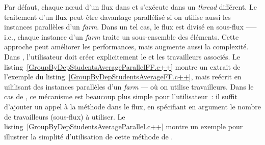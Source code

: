 Par d\'efaut, chaque nœud d'un flux dans  et  s'ex\'ecute dans un \emph{thread} diff\'erent. Le traitement d'un flux peut \^etre davantage parall\'elis\'e si on utilise aussi les instances parall\`eles d'un \emph{farm}. Dans un tel cas, le flux est divis\'e en sous-flux —-- i.e., chaque instance d'un \emph{farm} traite un sous-ensemble des \'el\'ements. Cette approche peut améliorer les performances, mais augmente aussi la complexit\'e. Dans , l'utilisateur doit cr\'eer explicitement le  et les travailleurs associés. Le listing~\ref{GroupByDepStudentsAverageParallelFF.c++} montre un extrait de l'exemple du listing~\ref{GroupByDepStudentsAverageFF.c++}, mais re\'ecrit en uililisant des instances parall\`eles d'un \emph{farm} --- où on utilise  travailleurs. Dans le cas de , ce m\'ecanisme est beaucoup plus simple pour l'utilisateur~: il suffit d'ajouter un appel à  la m\'ethode  dans le flux, en sp\'ecifiant en argument le nombre de travailleurs (sous-flux) \`a utiliser. Le listing~\ref{GroupByDepStudentsAverageParallel.c++} montre un exemple pour illustrer la simplit\'e d'utilisation de cette méthode de .




